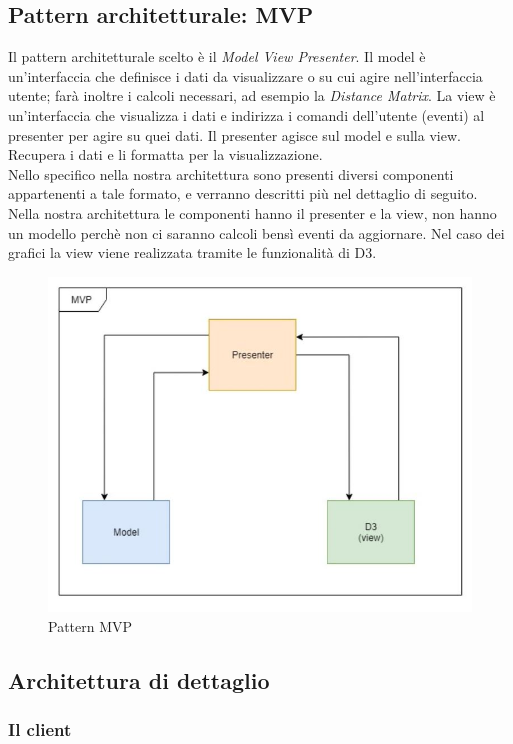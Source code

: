 \documentclass[../manuale_sviluppatore.tex]{subfiles}
\begin{document}
\subsection{Pattern architetturale: MVP}
Il pattern architetturale scelto è il \emph{Model View Presenter}. 
Il model è un'interfaccia che definisce i dati da visualizzare o su cui agire nell'interfaccia utente; farà inoltre i calcoli necessari, ad esempio la \emph{Distance Matrix}.
La view è un'interfaccia che visualizza i dati e indirizza i comandi dell'utente (eventi) al presenter per agire su quei dati.
Il presenter agisce sul model e sulla view. Recupera i dati e li formatta per la visualizzazione.\\
Nello specifico nella nostra architettura sono presenti diversi componenti appartenenti a tale formato, e verranno descritti più nel dettaglio di seguito.\\
Nella nostra architettura le componenti hanno il presenter e la view, non hanno un modello perchè non ci saranno calcoli bensì eventi da aggiornare. Nel caso dei
grafici la view viene realizzata tramite le funzionalità di D3.

\begin{figure}[H]
	\centering
	\includegraphics[width=18cm]{img/patternMVP.jpg}
	\caption{Pattern MVP}
\end{figure}

\subsection{Architettura di dettaglio}
\subsubsection{Il client}
\end{document}
